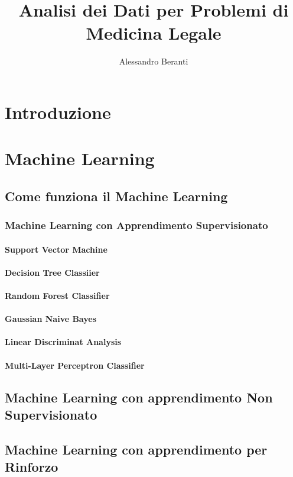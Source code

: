 \documentclass[11pt,a4paper]{book}
\author{Alessandro Beranti}
\title{Analisi dei Dati per Problemi di Medicina Legale}
\begin{document}
	\maketitle
	\chapter{Introduzione}
	\chapter{Machine Learning}
		\section{Come funziona il Machine Learning}
			\subsection{Machine Learning con Apprendimento Supervisionato}
			\subsubsection{Support Vector Machine}
			\subsubsection{Decision Tree Classiier}
			\subsubsection{Random Forest Classifier}
			\subsubsection{Gaussian Naive Bayes}
			\subsubsection{Linear Discriminat Analysis}
			\subsubsection{Multi-Layer Perceptron Classifier}
		\section{Machine Learning con apprendimento Non Supervisionato}
		\section{Machine Learning con apprendimento per Rinforzo}
\end{document}
